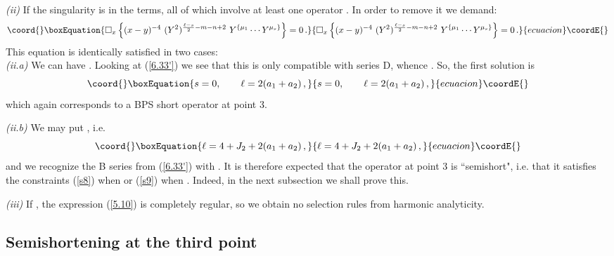 \documentclass[a4paper,11pt]{article}
\begin{document}
{\it (ii)} If \coordHE{} the singularity is in the \coordHE{} terms, all of which involve
at least one operator \coordHE{}. In order to remove it we demand:
\begin{equation}\coord{}\boxEquation{\label{5.11}
  \square_x \left\{(x-y)^{-4}
  \ (Y^2)^{\frac{\ell-s}{2}-m-n+2}\ Y^{\{\mu_1}\cdots
  Y^{\mu_s\}} \right\} = 0\,.
}{\square_x \left\{(x-y)^{-4}
  \ (Y^2)^{\frac{\ell-s}{2}-m-n+2}\ Y^{\{\mu_1}\cdots
  Y^{\mu_s\}} \right\} = 0\,.
}{ecuacion}\coordE{}\end{equation}
This equation is identically satisfied in two cases: \\
{\it (ii.a)} We can have \coordHE{}. Looking at (\ref{6.33'}) we see that this is only
compatible with series D, whence \coordHE{}. So, the first solution
is
\begin{equation}\coord{}\boxEquation{ \label{firstk1}
s=0, \qquad \ell = 2(a_1+a_2) \, ,
}{ s=0, \qquad \ell = 2(a_1+a_2) \, ,
}{ecuacion}\coordE{}\end{equation}
which again corresponds to a BPS short operator at point 3.

{\it (ii.b)}  We may put \coordHE{}, i.e.
\begin{equation}\coord{}\boxEquation{ \label{secondk1}
\ell = 4 +  J_2 + 2(a_1+a_2) \, ,
}{ \ell = 4 +  J_2 + 2(a_1+a_2) \, ,
}{ecuacion}\coordE{}\end{equation}
and we recognize the B series from (\ref{6.33'}) with \coordHE{}. It is
therefore expected that the operator at point 3 is ``semishort",
i.e. that it satisfies the constraints (\ref{s8}) when \coordHE{}
or (\ref{s9}) when \coordHE{}. Indeed, in the next subsection we shall
prove this.

{\it (iii)} If \coordHE{}, the expression (\ref{5.10}) is
completely regular, so we obtain no selection rules from harmonic
analyticity.


\subsection{Semishortening at the third point}
\end{document}
